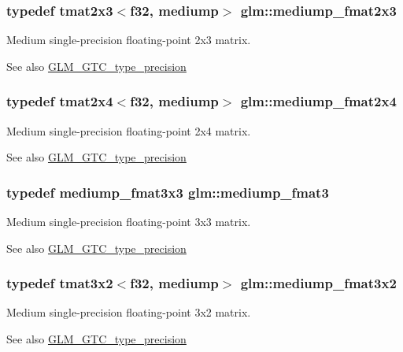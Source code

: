 \subsubsection[{mediump\+\_\+fmat2x3}]{\setlength{\rightskip}{0pt plus 5cm}typedef tmat2x3$<${\bf f32}, mediump$>$ {\bf glm\+::mediump\+\_\+fmat2x3}}\label{namespaceglm_a96eb5212b42c69eb09c0efc057fab4a1}
Medium single-\/precision floating-\/point 2x3 matrix. \begin{DoxySeeAlso}{See also}
\hyperlink{group__gtc__type__precision}{G\+L\+M\+\_\+\+G\+T\+C\+\_\+type\+\_\+precision} 
\end{DoxySeeAlso}
\hypertarget{namespaceglm_ade60eec42074540e68aa7dcbcb4a25f1}{}
\subsubsection[{mediump\+\_\+fmat2x4}]{\setlength{\rightskip}{0pt plus 5cm}typedef tmat2x4$<${\bf f32}, mediump$>$ {\bf glm\+::mediump\+\_\+fmat2x4}}\label{namespaceglm_ade60eec42074540e68aa7dcbcb4a25f1}
Medium single-\/precision floating-\/point 2x4 matrix. \begin{DoxySeeAlso}{See also}
\hyperlink{group__gtc__type__precision}{G\+L\+M\+\_\+\+G\+T\+C\+\_\+type\+\_\+precision} 
\end{DoxySeeAlso}
\hypertarget{namespaceglm_a85f2267401434ea8c5463af040f0760c}{}
\subsubsection[{mediump\+\_\+fmat3}]{\setlength{\rightskip}{0pt plus 5cm}typedef {\bf mediump\+\_\+fmat3x3} {\bf glm\+::mediump\+\_\+fmat3}}\label{namespaceglm_a85f2267401434ea8c5463af040f0760c}
Medium single-\/precision floating-\/point 3x3 matrix. \begin{DoxySeeAlso}{See also}
\hyperlink{group__gtc__type__precision}{G\+L\+M\+\_\+\+G\+T\+C\+\_\+type\+\_\+precision} 
\end{DoxySeeAlso}
\hypertarget{namespaceglm_ade4cf6efa8cec2545fc5c7ee25919a3d}{}
\subsubsection[{mediump\+\_\+fmat3x2}]{\setlength{\rightskip}{0pt plus 5cm}typedef tmat3x2$<${\bf f32}, mediump$>$ {\bf glm\+::mediump\+\_\+fmat3x2}}\label{namespaceglm_ade4cf6efa8cec2545fc5c7ee25919a3d}
Medium single-\/precision floating-\/point 3x2 matrix. \begin{DoxySeeAlso}{See also}
\hyperlink{group__gtc__type__precision}{G\+L\+M\+\_\+\+G\+T\+C\+\_\+type\+\_\+precision} 
\end{DoxySeeAlso}
\hypertarget{namespaceglm_a7719af89d88d87c3b60d7c9f06801711}{}
